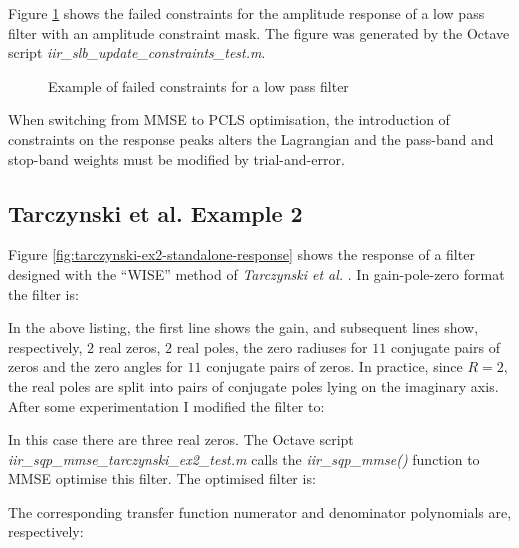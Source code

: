 \documentclass[a4paper,twoside,10pt,english]{report}
\begin{document}
Figure \ref{fig:iir-slb-update-constraints-test-x7A} shows the failed
constraints for the amplitude response of a low pass filter with an amplitude
constraint mask. The figure was generated by the Octave script 
\emph{iir\_slb\_update\_constraints\_test.m}.
\begin{figure}[!htbp]
\begin{center}
\scalebox{0.7}{}
\caption{Example of failed constraints for a low pass filter}
\label{fig:iir-slb-update-constraints-test-x7A} 
\end{center}
\end{figure}
When switching from MMSE to PCLS optimisation, the introduction of constraints
on the response peaks alters the Lagrangian and the pass-band and stop-band
weights must be modified by trial-and-error. 
\clearpage
\subsection{Tarczynski et al. Example 2}
Figure \ref{fig:tarczynski-ex2-standalone-response} shows the response of a
filter designed with the ``WISE'' method of \emph{Tarczynski et al.} 
\cite{TarczynskiCainHermanowiczRojewski_WISEMethodDesignIIRFilters}. In 
gain-pole-zero format the filter is:
\begin{small}

\end{small}
In the above listing, the first line shows the gain, and subsequent lines show,
respectively, $2$ real zeros, $2$ real poles, the zero radiuses for $11$
conjugate pairs of zeros and the zero angles for $11$ conjugate pairs of zeros.
In practice, since $R=2$, the real poles are split into pairs of conjugate
poles lying on the imaginary axis. After some experimentation I modified the
filter to:
\begin{small}

\end{small}
In this case there are three real zeros. The Octave script
\emph{iir\_sqp\_mmse\_tarczynski\_ex2\_test.m} calls the
\emph{iir\_sqp\_mmse()} function to MMSE optimise this filter. The optimised
filter is:
\begin{small}

\end{small}
The corresponding transfer function numerator and denominator polynomials are,
respectively:
\begin{small}

\end{small}
\end{document}
